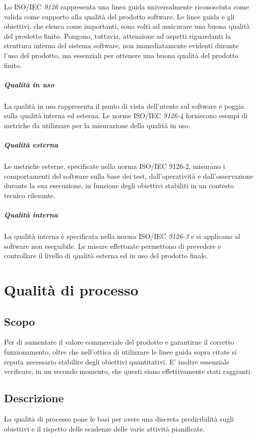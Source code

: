 \documentclass[12pt,a4paper]{article}
\begin{document}
Lo ISO/IEC \textit{9126} rappresenta una linea guida universalmente riconosciuta come valida come supporto alla qualità del prodotto software. Le linee guida e gli obiettivi, che elenca come importanti, sono volti ad assicurare una buona qualità del prodotto finito. Pongono, tuttavia, attenzione ad aspetti riguardanti la struttura interna del sistema software, non immediatamente evidenti durante l'uso del prodotto, ma essenziali per ottenere una buona qualità del prodotto finito.
\subparagraph{Qualità in uso}
La qualità in uso rappresenta il punto di vista dell'utente sul software e poggia sulla qualità interna ed esterna. Le norme ISO/IEC \textit{9126-4} forniscono esempi di metriche da utilizzare per la misurazione della qualità in uso.
\subparagraph{Qualità esterna}
Le metriche esterne, specificate nella norma ISO/IEC 9126-2, misurano i comportamenti del software sulla base dei test, dall'operatività e dall'osservazione durante la sua esecuzione, in funzione degli obiettivi stabiliti in un contesto tecnico rilevante.
\subparagraph{Qualità interna}
La qualità interna è specificata nella norma ISO/IEC \textit{9126-3} e si applicano al software non eseguibile. Le misure effettuate permettono di prevedere e controllare il livello di qualità esterna ed in uso del prodotto finale.



\section{Qualità di processo}
\subsection{Scopo}
Per di aumentare il valore commerciale del prodotto e garantirne il corretto funzionamento, oltre che nell'ottica di  utilizzare le linee guida sopra citate  si reputa necessario stabilire degli obiettivi quantitativi. E' inoltre essenziale verificare, in un secondo momento, che questi siano effettivamente stati raggiunti.
\subsection{Descrizione}
La qualità di processo pone le basi per avere una discreta predicibilità sugli obiettivi e il rispetto delle scadenze delle varie attività pianificate.
\end{document}
